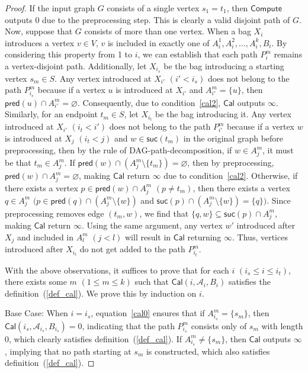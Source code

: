 \documentclass[runningheads]{llncs}
\theoremstyle{plain}
\theoremstyle{definition}
\begin{document}
\begin{proof}
    If the input graph $G$ consists of a single vertex $s_1 = t_1$, then $\mathsf{Compute}$ outputs 0 due to the preprocessing step. This is clearly a valid disjoint path of $G$. Now, suppose that $G$ consists of more than one vertex. When a bag $X_i$ introduces a vertex $v \in V$, $v$ is included in exactly one of $A^1_i, A^2_i, \dots, A^k_i, B_i$. By considering this property from 1 to $i$, we can establish that each path $P^m_i$ remains a vertex-disjoint path. Additionally, let $X_{i_s}$ be the bag introducing a starting vertex $s_m \in S$. Any vertex introduced at $X_{i'}$ $(i' < i_s)$ does not belong to the path $P^m_{i_s}$ because if a vertex $u$ is introduced at $X_{i'}$ and $A^m_{i'} = \{u\}$, then $\mathsf{pred}(u) \cap A^m_{i'} = \varnothing$. Consequently, due to condition~\ref{cal2}, $\mathsf{Cal}$ outputs $\infty$. Similarly, for an endpoint $t_m \in S$, let $X_{i_t}$ be the bag introducing it. Any vertex introduced at $X_{i'}$ $(i_t < i')$ does not belong to the path $P^m_{i'}$ because if a vertex $w$ is introduced at $X_j$ $(i_t < j)$ and $w \in \mathsf{suc}(t_m)$ in the original graph before preprocessing, then by the rule of DAG-path-decomposition, if $w \in A^m_j$, it must be that $t_m \in A^m_j$. If $\mathsf{pred}(w) \cap (A^m_j \setminus \{t_m\}) = \varnothing$, then by preprocessing, $\mathsf{pred}(w) \cap A^m_j = \varnothing$, making $\mathsf{Cal}$ return $\infty$ due to condition~\ref{cal2}. Otherwise, if there exists a vertex $p \in \mathsf{pred}(w) \cap A^m_j$ $(p \neq t_m)$, then there exists a vertex $q \in A^m_j$ $(p \in \mathsf{pred}(q) \cap (A^m_j \setminus \{w\})$ and $\mathsf{suc}(p) \cap (A^m_j \setminus \{w\}) = \{q\})$. Since preprocessing removes edge $(t_m, w)$, we find that $\{q, w\} \subseteq \mathsf{suc}(p) \cap A^m_j$, making $\mathsf{Cal}$ return $\infty$. Using the same argument, any vertex $w'$ introduced after $X_j$ and included in $A^m_l$ $(j < l)$ will result in $\mathsf{Cal}$ returning $\infty$. Thus, vertices introduced after $X_{i_t}$ do not get added to the path $P^m_{i_t}$. 

    With the above observations, it suffices to prove that for each $i$ $(i_s \leq i \leq i_t)$, there exists some $m$ $(1 \leq m \leq k)$ such that $\mathsf{Cal}(i, \mathscr{A}_i, B_i)$ satisfies the definition~(\ref{def_cal}). We prove this by induction on $i$. 

    Base Case: When $i = i_s$, equation~\ref{cal0} ensures that if $A^m_{i_s} = \{s_m\}$, then $\mathsf{Cal}(i_s, \mathscr{A}_{i_s}, B_{i_s}) = 0$, indicating that the path $P^m_{i_s}$ consists only of $s_m$ with length 0, which clearly satisfies definition~(\ref{def_cal}). If $A^m_{i_s} \neq \{s_m\}$, then $\mathsf{Cal}$ outputs $\infty$, implying that no path starting at $s_m$ is constructed, which also satisfies definition~(\ref{def_cal}).


\end{proof}
\end{document}
